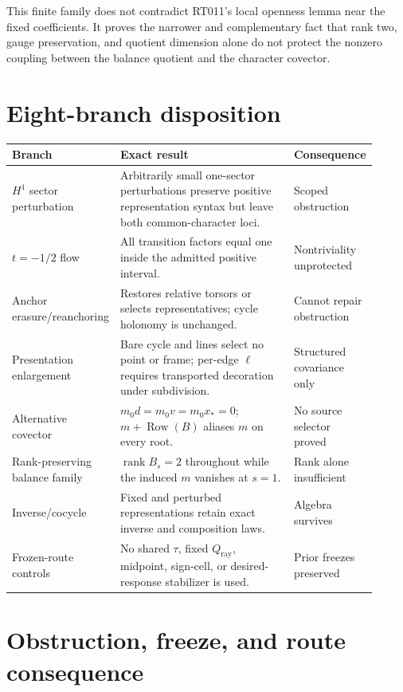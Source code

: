 \documentclass[11pt]{article}
\begin{document}
This finite family does not contradict RT011's local openness lemma near the
fixed coefficients.  It proves the narrower and complementary fact that rank
two, gauge preservation, and quotient dimension alone do not protect the
nonzero coupling between the balance quotient and the character covector.

\section{Eight-branch disposition}

\small
\begin{longtable}{@{}P{0.23\linewidth}P{0.49\linewidth}P{0.19\linewidth}@{}}
\toprule
Branch & Exact result & Consequence\\
\midrule
\endhead
$H^1$ sector perturbation & Arbitrarily small one-sector perturbations preserve positive representation syntax but leave both common-character loci. & Scoped obstruction\\
$t=-1/2$ flow & All transition factors equal one inside the admitted positive interval. & Nontriviality unprotected\\
Anchor erasure/reanchoring & Restores relative torsors or selects representatives; cycle holonomy is unchanged. & Cannot repair obstruction\\
Presentation enlargement & Bare cycle and lines select no point or frame; per-edge $\ell$ requires transported decoration under subdivision. & Structured covariance only\\
Alternative covector & $m_0d=m_0v=m_0x_*=0$; $m+\operatorname{Row}(B)$ aliases $m$ on every root. & No source selector proved\\
Rank-preserving balance family & $\operatorname{rank}B_s=2$ throughout while the induced $m$ vanishes at $s=1$. & Rank alone insufficient\\
Inverse/cocycle & Fixed and perturbed representations retain exact inverse and composition laws. & Algebra survives\\
Frozen-route controls & No shared $\tau$, fixed $Q_{\mathrm{ray}}$, midpoint, sign-cell, or desired-response stabilizer is used. & Prior freezes preserved\\
\bottomrule
\end{longtable}
\normalsize

\section{Obstruction, freeze, and route consequence}
\end{document}
